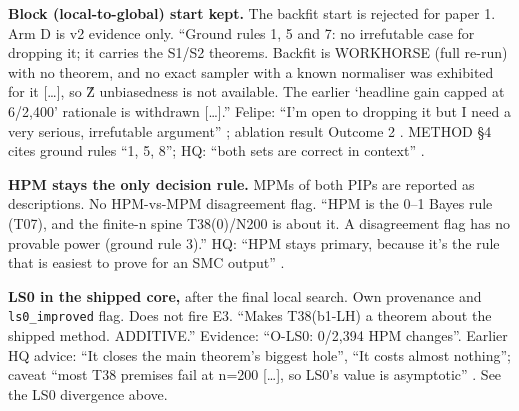 \par\smallskip\noindent{}
{\textbf{Block (local-to-global) start kept.} The backfit start is rejected for paper 1. Arm D is v2 evidence only.
}
{``Ground rules 1, 5 and 7: no irrefutable case for dropping it; it carries the S1/S2 theorems. Backfit is WORKHORSE (full
re-run) with no theorem, and no exact sampler with a known normaliser was exhibited for it [\dots], so Ẑ unbiasedness is not
available. The earlier `headline gain capped at 6/2,400' rationale is withdrawn [\dots].'' Felipe: ``I'm open to dropping it but I
need a very serious, irrefutable argument'' ; ablation result Outcome 2 . METHOD
\S4 cites ground rules ``1, 5, 8''; HQ: ``both sets are correct in context''
.}

\par\smallskip\noindent{}
{\textbf{HPM stays the only decision rule.} MPMs of both PIPs are reported as descriptions. No HPM-vs-MPM disagreement flag.
}
{``HPM is the 0--1 Bayes rule (T07), and the finite-n spine T38(0)/N200 is about it. A disagreement flag has no provable power
(ground rule 3).'' HQ: ``HPM stays primary, because it's the rule that is easiest to prove for an SMC output''
.}

\par\smallskip\noindent{}
{\textbf{LS0 in the shipped core,} after the final local search. Own provenance and \texttt{ls0\_improved} flag. Does not fire E3.
}
{``Makes T38(b1-LH) a theorem about the shipped method. ADDITIVE.'' Evidence: ``O-LS0: 0/2,394 HPM changes''. Earlier HQ advice:
``It closes the main theorem's biggest hole'', ``It costs almost nothing''; caveat ``most T38 premises fail at n=200 [\dots], so
LS0's value is asymptotic'' . See the LS0 divergence above.}

